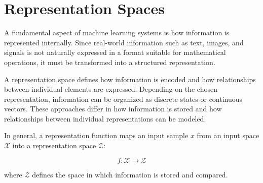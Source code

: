 \section{Representation Spaces}

A fundamental aspect of machine learning systems is how information is represented internally.
Since real-world information such as text, images, and signals is not naturally expressed in a format suitable for mathematical operations, it must be transformed into a structured representation.

A representation space defines how information is encoded and how relationships between individual elements are expressed. Depending on the chosen representation, information can be organized as discrete states or continuous vectors. These approaches differ in how information is stored and how relationships between individual representations can be modeled.

In general, a representation function maps an input sample $x$ from an input space $\mathcal{X}$ into a representation space $\mathcal{Z}$:

\begin{equation}
    f: \mathcal{X} \rightarrow \mathcal{Z}
\end{equation}

where $\mathcal{Z}$ defines the space in which information is stored and compared.





